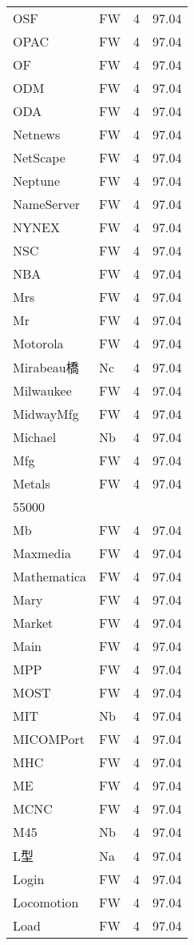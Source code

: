\documentclass[twocolumn]{book}
\begin{document}
\begin{supertabular}{llrr}
OSF & FW & 4 &  97.04\\
OPAC & FW & 4 &  97.04\\
OF & FW & 4 &  97.04\\
ODM & FW & 4 &  97.04\\
ODA & FW & 4 &  97.04\\
Netnews & FW & 4 &  97.04\\
NetScape & FW & 4 &  97.04\\
Neptune & FW & 4 &  97.04\\
NameServer & FW & 4 &  97.04\\
NYNEX & FW & 4 &  97.04\\
NSC & FW & 4 &  97.04\\
NBA & FW & 4 &  97.04\\
Mrs & FW & 4 &  97.04\\
Mr & FW & 4 &  97.04\\
Motorola & FW & 4 &  97.04\\
Mirabeau橋 & Nc & 4 &  97.04\\
Milwaukee & FW & 4 &  97.04\\
MidwayMfg & FW & 4 &  97.04\\
Michael & Nb & 4 &  97.04\\
Mfg & FW & 4 &  97.04\\
Metals & FW & 4 &  97.04\\
55000\\
Mb & FW & 4 &  97.04\\
Maxmedia & FW & 4 &  97.04\\
Mathematica & FW & 4 &  97.04\\
Mary & FW & 4 &  97.04\\
Market & FW & 4 &  97.04\\
Main & FW & 4 &  97.04\\
MPP & FW & 4 &  97.04\\
MOST & FW & 4 &  97.04\\
MIT & Nb & 4 &  97.04\\
MICOMPort & FW & 4 &  97.04\\
MHC & FW & 4 &  97.04\\
ME & FW & 4 &  97.04\\
MCNC & FW & 4 &  97.04\\
M45 & Nb & 4 &  97.04\\
L型 & Na & 4 &  97.04\\
Login & FW & 4 &  97.04\\
Locomotion & FW & 4 &  97.04\\
Load & FW & 4 &  97.04\\

\end{supertabular}
\end{document}
